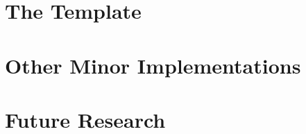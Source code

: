 \documentclass[xetex]{beamer}
\begin{document}
\section{The Template}




\section{Other Minor Implementations}




\section{Future Research}









\end{document}
